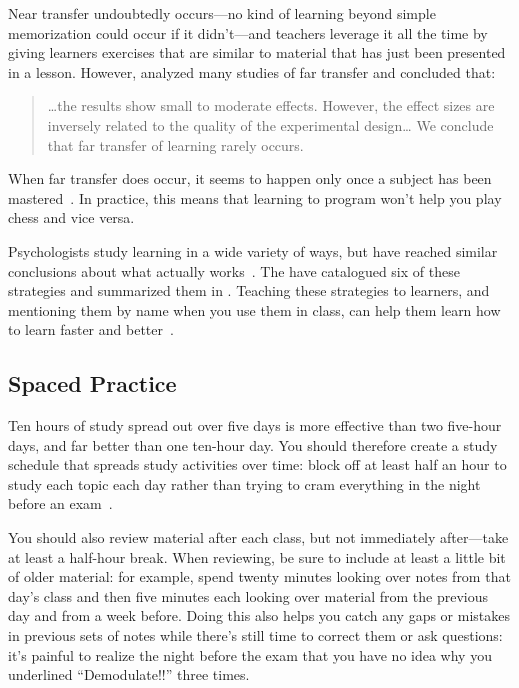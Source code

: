 Near transfer undoubtedly occurs---no kind of learning
beyond simple memorization could occur if it didn't---and
teachers leverage it all the time
by giving learners exercises that are similar to material that has just been presented in a lesson.
However,
\cite{Sala2017} analyzed many studies of far transfer
and concluded that:

\begin{quote}

  {\ldots}the results show small to moderate effects.
  However, the effect sizes are inversely related to the quality of the experimental design{\ldots}
  We conclude that far transfer of learning rarely occurs.

\end{quote}

When far transfer does occur,
it seems to happen only once a subject has been mastered~\cite{Gick1987}.
In practice,
this means that learning to program won't help you play chess and vice versa.


Psychologists study learning in a wide variety of ways,
but have reached similar conclusions about what actually works~\cite{Mark2018}.
The 
have catalogued six of these strategies and
summarized them in .
Teaching these strategies to learners,
and mentioning them by name when you use them in class,
can help them learn how to learn faster and better~\cite{Wein2018a,Wein2018b}.

\subsection*{Spaced Practice}

Ten hours of study spread out over five days
is more effective than two five-hour days,
and far better than one ten-hour day.
You should therefore create a study schedule that spreads study activities over time:
block off at least half an hour to study each topic each day
rather than trying to cram everything in the night before an exam~\cite{Kang2016}.

You should also review material after each class,
but not immediately after---take at least a half-hour break.
When reviewing,
be sure to include at least a little bit of older material:
for example,
spend twenty minutes looking over notes from that day's class
and then five minutes each looking over material from the previous day
and from a week before.
Doing this also helps you catch any gaps or mistakes in previous sets of notes
while there's still time to correct them or ask questions:
it's painful to realize the night before the exam
that you have no idea why you underlined ``Demodulate!!'' three times.

